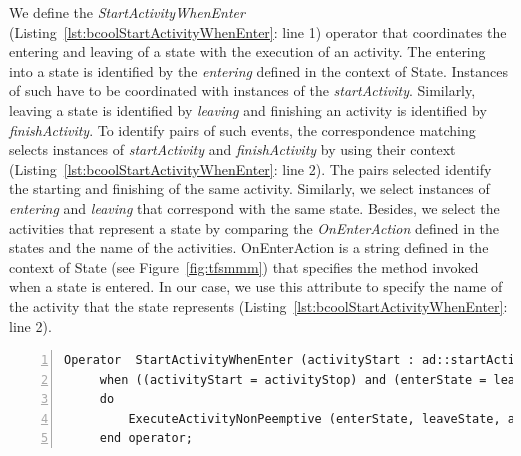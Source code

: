 	
We define the \emph{StartActivityWhenEnter} (Listing~\ref{lst:bcoolStartActivityWhenEnter}: line 1) operator that coordinates the entering and leaving of a state with the execution of an activity. The entering into a state is identified by the \dse \textit{entering} defined in the context of State. Instances of such \dse have to be coordinated with instances of the \dse \textit{startActivity}. Similarly, leaving a state is identified by \dse \textit{leaving} and finishing an activity is identified by \dse \textit{finishActivity}. To identify pairs of such events, the correspondence matching selects instances of \dse \emph{startActivity} and \emph{finishActivity} by using their context (Listing~\ref{lst:bcoolStartActivityWhenEnter}: line 2). The pairs selected identify the starting and finishing of the same activity. Similarly, we select instances of \dse \emph{entering} and \emph{leaving} that correspond with the same state. Besides, we select the activities that represent a state by comparing the \emph{OnEnterAction} defined in the states and the name of the activities. OnEnterAction is a string defined in the context of State (see Figure~\ref{fig:tfsmmm}) that specifies the method invoked when a state is entered. In our case, we use this attribute to specify the name of the activity that the state represents (Listing~\ref{lst:bcoolStartActivityWhenEnter}: line 2).
	
	 
	 \begin{lstlisting}[language=bcool,
	 caption={\bcool specification of the \emph{StartActivityWhenEnter} operator},
	 label={lst:bcoolStartActivityWhenEnter}, 
	 basicstyle=\scriptsize\ttfamily, backgroundcolor=\color{LGrey}, numbers=left, xleftmargin=2pt]
	 Operator  StartActivityWhenEnter (activityStart : ad::startActivity , activityStop : ad::finishActivity, enterState : tfsm::entering, leaveState : tfsm::leaving)
	 when ((activityStart = activityStop) and (enterState = leaveState) and (activityStart.name = enterState.onEnterAction));
	 do 
		 ExecuteActivityNonPeemptive (enterState, leaveState, activityStart, activityStop)
	 end operator;
	 \end{lstlisting}
	 
